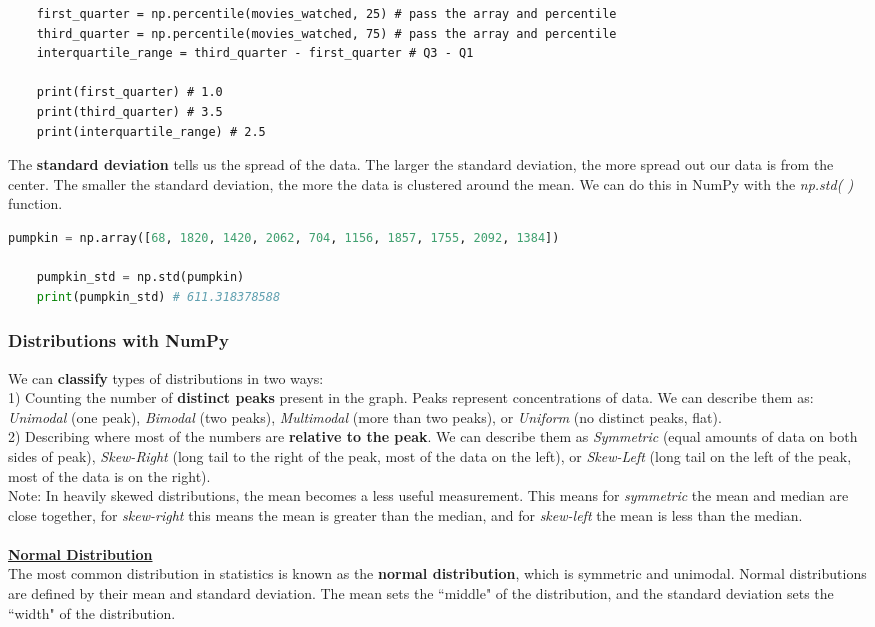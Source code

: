 \documentclass[11pt, a4paper]{article}
\begin{document}
\begin{spacing}{1.1}
\begin{lstlisting}
	first_quarter = np.percentile(movies_watched, 25) # pass the array and percentile
	third_quarter = np.percentile(movies_watched, 75) # pass the array and percentile
	interquartile_range = third_quarter - first_quarter # Q3 - Q1
	
	print(first_quarter) # 1.0
	print(third_quarter) # 3.5
	print(interquartile_range) # 2.5 \end{lstlisting}\vspace*{1mm}
	The \textbf{standard deviation} tells us the spread of the data. The larger the standard deviation, the more spread out our data is from the center. The smaller the standard deviation, the more the data is clustered around the mean. We can do this in NumPy with the \textit{np.std( )} function.
	\begin{lstlisting}[language=Python]
	pumpkin = np.array([68, 1820, 1420, 2062, 704, 1156, 1857, 1755, 2092, 1384])
	
	pumpkin_std = np.std(pumpkin)
	print(pumpkin_std) # 611.318378588 \end{lstlisting}\vspace*{4mm}
	
	\subsubsection{Distributions with NumPy}
	We can \textbf{classify} types of distributions in two ways: \vspace*{1mm} \\
	1) Counting the number of \textbf{distinct peaks} present in the graph. Peaks represent concentrations of data. We can describe them as: \textit{Unimodal} (one peak), \textit{Bimodal} (two peaks), \textit{Multimodal} (more than two peaks), or \textit{Uniform} (no distinct peaks, flat). \vspace*{2mm} \\
	2) Describing where most of the numbers are \textbf{relative to the peak}. We can describe them as \textit{Symmetric} (equal amounts of data on both sides of peak), \textit{Skew-Right} (long tail to the right of the peak, most of the data on the left), or \textit{Skew-Left} (long tail on the left of the peak, most of the data is on the right). \vspace*{2mm} \\
	Note: In heavily skewed distributions, the mean becomes a less useful measurement. This means for \textit{symmetric} the mean and median are close together, for \textit{skew-right} this means the mean is greater than the median, and for \textit{skew-left} the mean is less than the median. \\~\\
	\underline{\textbf{Normal Distribution}} \\
	The most common distribution in statistics is known as the \textbf{normal distribution}, which is symmetric and unimodal. Normal distributions are defined by their mean and standard deviation. The mean sets the ``middle" of the distribution, and the standard deviation sets the ``width" of the distribution. \newpage


\end{spacing}
\end{document}
